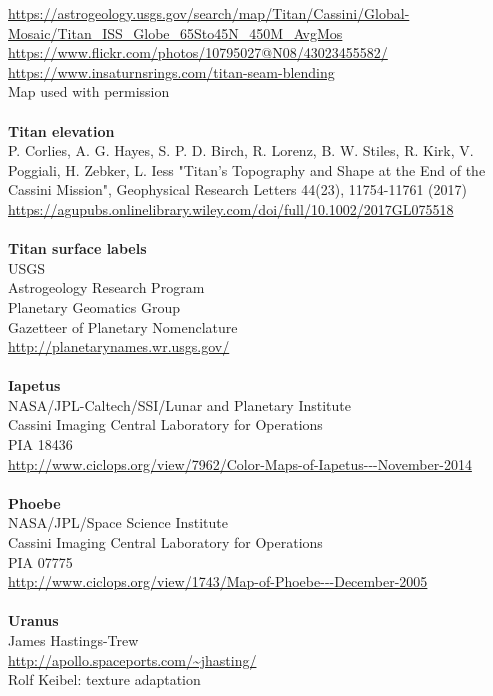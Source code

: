 \documentclass[Orbiter User Manual.tex]{subfiles}
\begin{document}
\url{https://astrogeology.usgs.gov/search/map/Titan/Cassini/Global-Mosaic/Titan_ISS_Globe_65Sto45N_450M_AvgMos}\\
\url{https://www.flickr.com/photos/10795027@N08/43023455582/}\\
\url{https://www.insaturnsrings.com/titan-seam-blending}\\
Map used with permission\\
\\
\textbf{Titan elevation}\\
P. Corlies, A. G. Hayes, S. P. D. Birch, R. Lorenz, B. W. Stiles, R. Kirk, V. Poggiali, H. Zebker, L. Iess "Titan's Topography and Shape at the End of the Cassini Mission", Geophysical Research Letters 44(23), 11754-11761 (2017)\\
\url{https://agupubs.onlinelibrary.wiley.com/doi/full/10.1002/2017GL075518}\\
\\
\textbf{Titan surface labels}\\
USGS\\
Astrogeology Research Program\\
Planetary Geomatics Group\\
Gazetteer of Planetary Nomenclature\\
\url{http://planetarynames.wr.usgs.gov/}\\
\\
\textbf{Iapetus}\\
NASA/JPL-Caltech/SSI/Lunar and Planetary Institute\\
Cassini Imaging Central Laboratory for Operations\\
PIA 18436\\
\url{http://www.ciclops.org/view/7962/Color-Maps-of-Iapetus---November-2014}\\
\\
\textbf{Phoebe}\\
NASA/JPL/Space Science Institute\\
Cassini Imaging Central Laboratory for Operations\\
PIA 07775\\
\url{http://www.ciclops.org/view/1743/Map-of-Phoebe---December-2005}\\
\\
\textbf{Uranus}\\
James Hastings-Trew\\
\url{http://apollo.spaceports.com/~jhasting/}\\
Rolf Keibel: texture adaptation\\
\end{document}
